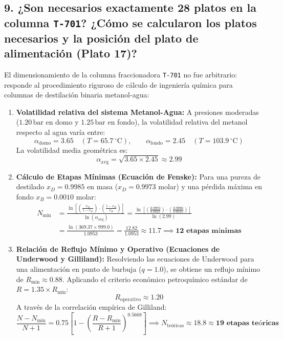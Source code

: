 \documentclass[11pt,a4paper]{article}
\begin{document}
\subsection{9. ¿Son necesarios exactamente 28 platos en la columna \texttt{T-701}? ¿Cómo se calcularon los platos necesarios y la posición del plato de alimentación (Plato 17)?}
El dimensionamiento de la columna fraccionadora \texttt{T-701} no fue arbitrario: responde al procedimiento riguroso de cálculo de ingeniería química para columnas de destilación binaria metanol-agua:

\begin{enumerate}
    \item \textbf{Volatilidad relativa del sistema Metanol-Agua:}
    A presiones moderadas ($1.20\,\text{bar}$ en domo y $1.25\,\text{bar}$ en fondo), la volatilidad relativa del metanol respecto al agua varía entre:
    \begin{equation}
        \alpha_{\text{domo}} = 3.65 \quad (T = 65.7\,^\circ\text{C}), \qquad \alpha_{\text{fondo}} = 2.45 \quad (T = 103.9\,^\circ\text{C})
    \end{equation}
    La volatilidad media geométrica es:
    \begin{equation}
        \alpha_{\text{avg}} = \sqrt{3.65 \times 2.45} \approx \mathbf{2.99}
    \end{equation}

    \item \textbf{Cálculo de Etapas Mínimas (Ecuación de Fenske):}
    Para una pureza de destilado $x_D = 0.9985$ en masa ($x_D = 0.9973$ molar) y una pérdida máxima en fondo $x_B = 0.0010$ molar:
    \begin{align}
        N_{\text{min}} &= \frac{\ln\left[ \left(\frac{x_D}{1 - x_D}\right) \cdot \left(\frac{1 - x_B}{x_B}\right) \right]}{\ln(\alpha_{\text{avg}})} = \frac{\ln\left[ \left(\frac{0.9973}{0.0027}\right) \cdot \left(\frac{0.9990}{0.0010}\right) \right]}{\ln(2.99)} \nonumber \\
        &= \frac{\ln(369.37 \times 999.0)}{1.0953} = \frac{12.82}{1.0953} \approx \mathbf{11.7} \implies \mathbf{12\text{ etapas mínimas}}
    \end{align}

    \item \textbf{Relación de Reflujo Mínimo y Operativo (Ecuaciones de Underwood y Gilliland):}
    Resolviendo las ecuaciones de Underwood para una alimentación en punto de burbuja ($q = 1.0$), se obtiene un reflujo mínimo de $R_{\text{min}} \approx 0.88$.
    Aplicando el criterio económico petroquímico estándar de $R = 1.35 \times R_{\text{min}}$:
    \begin{equation}
        R_{\text{operativo}} \approx \mathbf{1.20}
    \end{equation}
    A través de la correlación empírica de Gilliland:
    \begin{equation}
        \frac{N - N_{\text{min}}}{N + 1} = 0.75 \left[ 1 - \left(\frac{R - R_{\text{min}}}{R + 1}\right)^{0.5668} \right] \implies N_{\text{teóricas}} \approx \mathbf{18.8} \approx \mathbf{19\text{ etapas teóricas}}
    \end{equation}


\end{enumerate}
\end{document}
